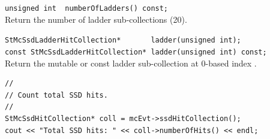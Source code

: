 \begin{Entry}
    \verb+unsigned int  numberOfLadders() const;+\\
    Return the number of ladder sub-collections (20).

    \verb+StMcSsdLadderHitCollection*       ladder(unsigned int);+\\
    \verb+const StMcSsdLadderHitCollection* ladder(unsigned int) const;+\\
    Return the mutable or const ladder sub-collection at 0-based index
    .

\item[Examples]
{\footnotesize
\begin{verbatim}
//
// Count total SSD hits.
//
StMcSsdHitCollection* coll = mcEvt->ssdHitCollection();
cout << "Total SSD hits: " << coll->numberOfHits() << endl;
\end{verbatim}
}%
\end{Entry}
\clearpage

%
%
